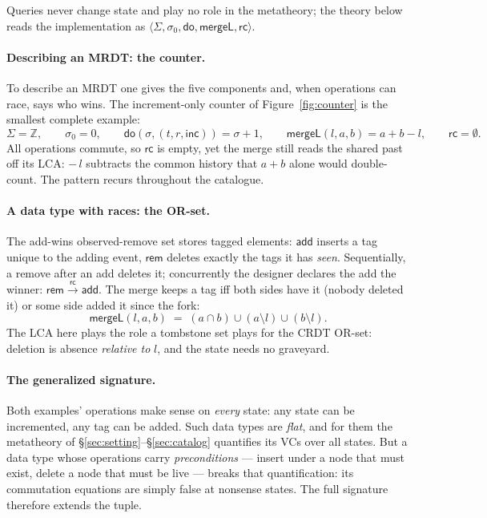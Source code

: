\documentclass[11pt]{article}
\newcommand{\rc}{\xrightarrow{\mathsf{rc}}}      %
\newcommand{\rcrel}{\mathsf{rc}}                 %
\newcommand{\add}{\mathsf{add}}
\newcommand{\rem}{\mathsf{rem}}
\newcommand{\mergeL}{\mathsf{mergeL}}
\newcommand{\Sinit}{\sigma_0}
\begin{document}
Queries never change state and play no role in the metatheory; the
theory below reads the implementation as
$\langle \Sigma, \Sinit, \mathsf{do}, \mergeL, \rcrel\rangle$.

\paragraph{Describing an MRDT: the counter.} To describe an MRDT one
gives the five components and, when operations can race, says who wins.
The increment-only counter of Figure~\ref{fig:counter} is the smallest
complete example:
\[
  \Sigma = \mathbb{Z}, \qquad \Sinit = 0, \qquad
  \mathsf{do}(\sigma, (t,r,\mathsf{inc})) = \sigma + 1, \qquad
  \mergeL(l,a,b) = a + b - l, \qquad \rcrel = \emptyset .
\]
All operations commute, so $\rcrel$ is empty, yet the merge still reads
the shared past off its LCA: $-\,l$ subtracts the common history that
$a + b$ alone would double-count. The pattern recurs throughout the
catalogue.

\paragraph{A data type with races: the OR-set.} The add-wins observed-remove
set stores tagged elements: $\add$ inserts a tag unique to the adding
event, $\rem$ deletes exactly the tags it has \emph{seen}. Sequentially,
a remove after an add deletes it; concurrently the designer declares the
add the winner: $\rem \rc \add$. The merge keeps a tag iff both sides
have it (nobody deleted it) or some side added it since the fork:
\[
  \mergeL(l,a,b) \;=\; (a \cap b) \cup (a \setminus l) \cup (b \setminus l).
\]
The LCA here plays the role a tombstone set plays for the CRDT OR-set:
deletion is absence \emph{relative to} $l$, and the state needs no
graveyard.

\paragraph{The generalized signature.} Both examples' operations make
sense on \emph{every} state: any state can be incremented, any tag can be
added. Such data types are \emph{flat}, and for them the metatheory of
\S\ref{sec:setting}--\S\ref{sec:catalog} quantifies its VCs over all
states. But a data type whose operations carry \emph{preconditions} ---
insert under a node that must exist, delete a node that must be live ---
breaks that quantification: its commutation equations are simply false at
nonsense states. The full signature therefore extends the tuple.
\end{document}
